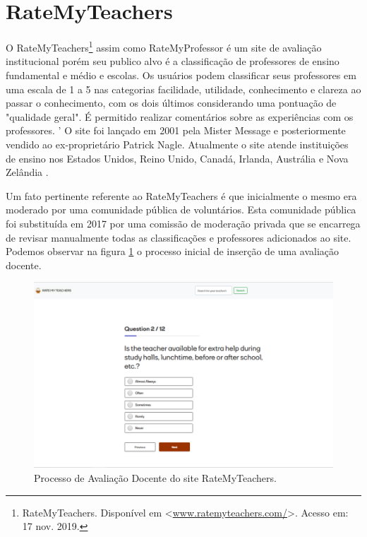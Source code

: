\documentclass[12pt, a4paper]{report}
\begin{document}
\section{RateMyTeachers}

O RateMyTeachers\footnote{RateMyTeachers. Disponível em <\url{www.ratemyteachers.com/}>. Acesso em: 17 nov. 2019.} assim como RateMyProfessor é um site de avaliação institucional porém seu publico alvo é a classificação de professores de ensino fundamental e médio e escolas. Os usuários podem classificar seus professores em uma escala de 1 a 5 nas categorias facilidade, utilidade, conhecimento e clareza ao passar o conhecimento, com os dois últimos considerando uma pontuação de "qualidade geral". É permitido realizar comentários sobre as experiências com os professores.
'
O site foi lançado em 2001 pela Mister Message e posteriormente vendido ao ex-proprietário Patrick Nagle. Atualmente o site atende instituições de ensino nos Estados Unidos, Reino Unido, Canadá, Irlanda, Austrália e Nova Zelândia .

Um fato pertinente referente ao RateMyTeachers é que inicialmente o mesmo era moderado por uma comunidade pública de voluntários. Esta comunidade pública foi substituída em 2017 por uma comissão de moderação privada que se encarrega de revisar manualmente todas as classificações e professores adicionados ao site. Podemos observar na figura \ref{fig:ratemyteacher} o processo inicial de inserção de uma avaliação docente.

\begin{figure}
\centering
\includegraphics[scale=0.45]{ratemyteachers.png}
\caption{Processo de Avaliação Docente do site RateMyTeachers.}
\label{fig:ratemyteacher}
\end{figure}
\end{document}

